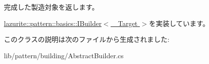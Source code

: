 完成した製造対象を返します。 

\hyperlink{interfacelazurite_1_1pattern_1_1basics_1_1_i_builder_3_01___target_01_4_a7955fa44ef66bbe59f764a300001cead}{lazurite::pattern::basics::IBuilder$<$ \_\-Target $>$}を実装しています。

このクラスの説明は次のファイルから生成されました:\begin{DoxyCompactItemize}
\item 
lib/pattern/building/AbstractBuilder.cs\end{DoxyCompactItemize}
